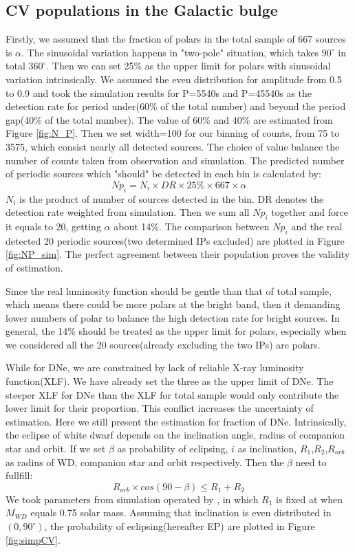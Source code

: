 \documentclass[twoside,twocolumn]{aastex63}
\begin{document}
\subsection{CV populations in the Galactic bulge}
Firstly, we assumed that the fraction of polars in the total sample of 667 sources is $\alpha$. The sinusoidal variation happens in "two-pole" situation, which takes $90^\circ$ in total $360^\circ$. Then we can set 25\% as the upper limit for polars with sinusoidal variation intrinsically. We assumed the even distribution for amplitude from 0.5 to 0.9 and took the simulation results for P=5540s and P=45540s as the detection rate for period under(60\% of the total number) and beyond the period gap(40\% of the total number). The value of 60\% and 40\% are estimated from Figure \ref{fig:N_P}. Then we set width=100 for our binning of counts, from 75 to 3575, which consist nearly all detected sources. The choice of value balance the number of counts taken from observation and simulation. 
 The predicted number of periodic sources which "should" be detected in each bin is calculated by:
\begin{equation}
Np_{i}=N_i\times DR \times 25\% \times 667 \times \alpha	
\end{equation}
$N_i$ is the product of number of sources detected in the bin. DR denotes the detection rate weighted from simulation. Then we sum all $Np_{i}$ together and force it equals to 20,  getting $\alpha$ about 14\%. The comparison between $Np_{i}$ and the real detected 20 periodic sources(two determined IPs excluded) are plotted in Figure \ref{fig:NP_sim}. The perfect agreement between their population proves the validity of estimation.

Since the real luminosity function should be gentle than that of  total sample, which means there could be more polars at the bright band, then it demanding lower numbers of polar to balance the high detection rate for bright sources. 
In general, the 14\% should be treated as the upper limit for polars, especially when we considered all the 20 sources(already excluding the two IPs) are polars. 

While for DNe, we are constrained by lack of reliable X-ray luminosity function(XLF). We have already set the three as the upper limit of DNe. The steeper XLF for DNe than the XLF for total sample would only contribute the lower limit for their proportion. This conflict increases the  uncertainty of estimation. Here we still present the estimation for fraction of DNe.
Intrinsically, the eclipse of white dwarf depends on the inclination angle, radius of companion star and orbit. If we set $\beta$ as probability of eclipsing, $i$ as inclination, $R_1$,$R_2$,$R_{orb}$ as radius of WD, companion star and orbit respectively. Then the $\beta$ need to fullfill:
\begin{equation}
{R_{orb}\times cos(90-\beta)}\leq { R_1+R_2}
\end{equation}
We took parameters from simulation operated by \citep{2011ApJS..194...28K}, in which $R_1$ is fixed at when $M_{WD}$ equals 0.75 solar mass. Assuming that inclination is even distributed in $(0,90^\circ)$, the probability of eclipsing(hereafter EP) are plotted in Figure \ref{fig:simpCV}.
\end{document}
